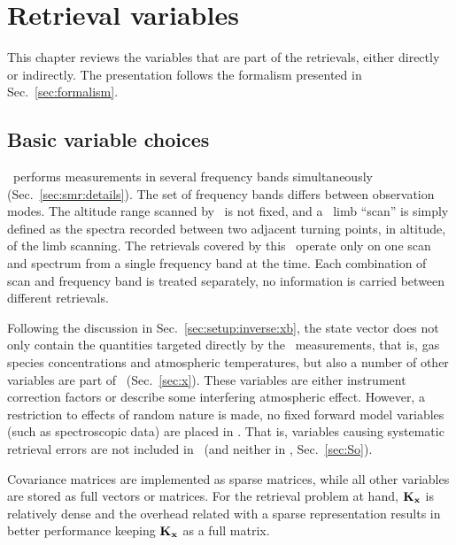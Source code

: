 \chapter{Retrieval variables}
\label{chapter:retvars}

This chapter reviews the variables that are part of the retrievals, either
directly or indirectly. The presentation follows the formalism presented in
Sec.~\ref{sec:formalism}.


\section{Basic variable choices}
\label{sec:retr:basics}
%
\smr\ performs measurements in several frequency bands simultaneously
(Sec.~\ref{sec:smr:details}). The set of frequency bands differs between
observation modes\addref. The altitude range scanned by \smr\ is not fixed, and
a \smr\ limb ``scan'' is simply defined as the spectra recorded between two
adjacent turning points, in altitude, of the limb scanning\addref. The
retrievals covered by this \ATBD\ operate only on one scan and spectrum from a
single frequency band at the time. Each combination of scan and frequency band
is treated separately, no information is carried between different retrievals.

Following the discussion in Sec.~\ref{sec:setup:inverse:xb}, the state vector
does not only contain the quantities targeted directly by the \smr\
measurements, that is, gas species concentrations and atmospheric temperatures,
but also a number of other variables are part of \SttVct\ (Sec.~\ref{sec:x}).
These variables are either instrument correction factors or describe some
interfering atmospheric effect. However, a restriction to effects of random
nature is made, no fixed forward model variables (such as spectroscopic data)
are placed in \SttVct. That is, variables causing systematic retrieval errors
are not included in \SttVct\ (and neither in \aCvrMtr{o}, Sec.~\ref{sec:So}).

Covariance matrices are implemented as sparse matrices, while all other
variables are stored as full vectors or matrices. For the retrieval problem at
hand, $\mathbf{K}_{\mathbf{x}}$ is relatively dense and the overhead related with
a sparse representation results in better performance keeping
$\mathbf{K}_{\mathbf{x}}$ as a full matrix.



